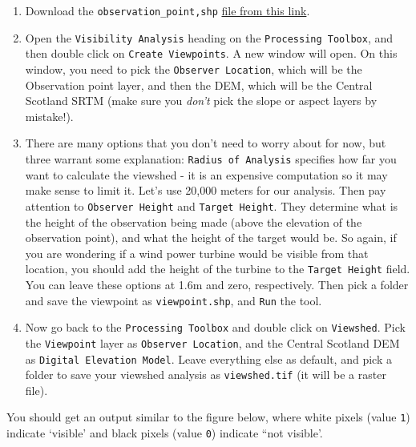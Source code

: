 \documentclass[
  letterpaper,
  DIV=11,
  numbers=noendperiod]{scrreprt}
\begin{document}
\begin{enumerate}
\def\labelenumi{(\arabic{enumi})}
\setcounter{enumi}{152}
\item
  Download the \texttt{observation\_point,shp}
  \href{https://stir-my.sharepoint.com/:u:/g/personal/ala2_stir_ac_uk/EWG4zHZtEchMnkRo4Dyg-0ABn8kz7vnY4MABGkHJtBn8xg?e=zMQBZu}{file
  from this link}.
\item
  Open the \texttt{Visibility\ Analysis} heading on the
  \texttt{Processing\ Toolbox}, and then double click on
  \texttt{Create\ Viewpoints}. A new window will open. On this window,
  you need to pick the \texttt{Observer\ Location}, which will be the
  Observation point layer, and then the DEM, which will be the Central
  Scotland SRTM (make sure you \emph{don't} pick the slope or aspect
  layers by mistake!).
\item
  There are many options that you don't need to worry about for now, but
  three warrant some explanation: \texttt{Radius\ of\ Analysis}
  specifies how far you want to calculate the viewshed - it is an
  expensive computation so it may make sense to limit it. Let's use
  20,000 meters for our analysis. Then pay attention to
  \texttt{Observer\ Height} and \texttt{Target\ Height}. They determine
  what is the height of the observation being made (above the elevation
  of the observation point), and what the height of the target would be.
  So again, if you are wondering if a wind power turbine would be
  visible from that location, you should add the height of the turbine
  to the \texttt{Target\ Height} field. You can leave these options at
  1.6m and zero, respectively. Then pick a folder and save the viewpoint
  as \texttt{viewpoint.shp}, and \texttt{Run} the tool.
\item
  Now go back to the \texttt{Processing\ Toolbox} and double click on
  \texttt{Viewshed}. Pick the \texttt{Viewpoint} layer as
  \texttt{Observer\ Location}, and the Central Scotland DEM as
  \texttt{Digital\ Elevation\ Model}. Leave everything else as default,
  and pick a folder to save your viewshed analysis as
  \texttt{viewshed.tif} (it will be a raster file).
\end{enumerate}

You should get an output similar to the figure below, where white pixels
(value \texttt{1}) indicate `visible' and black pixels (value
\texttt{0}) indicate ``not visible'.
\end{document}
